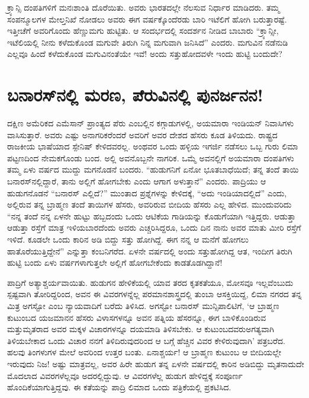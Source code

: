 \newpage

ಕ್ರ್ಯಾನ್ಸಿ ದಂಪತಿಗಳಿಗೆ ಮನಃಶಾಂತಿ ದೊರೆಯಿತು. ಅವರು ಭಾರತದಲ್ಲೇ ನೆಲಸುವ ನಿರ್ಧಾರ ಮಾಡಿದರು. ತಮ್ಮ ಸಂಪನ್ಮೂಲಗಳ ಮೇಲ್ತನಿಖೆ ನೋಡಲು ಅವರು ಈಗ ವರ್ಷಕ್ಕೊಂದೆರಡು ಬಾರಿ ಇಟೆಲಿಗೆ ಹೋಗಿ ಬರುತ್ತಾರಷ್ಟೆ. ಇತ್ತೀಚೆಗೆ ಅವರಿಗೊಂದು ಹೆಣ್ಣುಮಗು ಹುಟ್ಟಿತು. ಆ ಸಂದರ್ಭದಲ್ಲಿ ಸಂದರ್ಶನ ನೀಡಿದ ಬಾಬಾರು “ಕ್ರ್ಯಾನ್ಸೀ, ಇಟೆಲಿಯಲ್ಲಿ ನೀನು ಕಳೆದುಕೊಂಡ ಮಗುವೇ ತಿರುಗಿ ನಿನ್ನ ಮಗುವಾಗಿ ಜನಿಸಿದೆ” ಎಂದರು. ಮಗುವಿನ ನಡೆನುಡಿ ಎಲ್ಲವೂ ಹಿಂದೆ ಕಳೆದುಕೊಂಡ ಮಗುವಿನಂತೆಯೇ ಇವೆ! ಅಂದು ಸತ್ತುಹೋದವಳೇ ಇಂದು ಹುಟ್ಟಿ ಬಂದುದೇ?


\section*{ಬನಾರಸ್​ನಲ್ಲಿ ಮರಣ, ಪೆರುವಿನಲ್ಲಿ ಪುನರ್ಜನನ!}


ದಕ್ಷಿಣ ಅಮೆರಿಕದ ಎಮೆಸಾನ್ ಪ್ರಾಂತ್ಯದ ಪೆರು ಎಂಬಲ್ಲಿನ ಕಗ್ಗಾಡುಗಳಲ್ಲಿ, ಅಯಮಾರಾ ಇಂಡಿಯನ್ ನಿವಾಸಿಗಳು ವಾಸಿಸುತ್ತಾರೆ. ಅವರು ಎಷ್ಟು ಅನಾಗರಿಕರೆಂದರೆ ಅವರಿಗೆ ಅವರ ದೇಶದ ಹೆಸರು ಕೂಡ ತಿಳಿಯದು. ರಾಷ್ಟ್ರದ ರಾಜಕೀಯ ಭಾಷೆಯಾದ ಸ್ಪೇನಿಷ್ ಕೇಳಿದವರಲ್ಲ. ಅಂಥವರ ಒಂದು ಹಳ್ಳಿಯ ಇಗರ್ಜಿ ನಡೆಸಲು ಒಬ್ಬ ಗುರು ಲಿಮಾ ಪಟ್ಟಣದಿಂದ ನೇಮಕ\-ಗೊಂಡು ಬಂದ. ಅಲ್ಲಿ ಅವನೊಬ್ಬನೇ ನಾಗರಿಕ. ಒಮ್ಮೆ ಅವನಲ್ಲಿಗೆ ಅಯಮಾರಾ ದಂಪತಿಗಳು ತಮ್ಮ ಏಳು ವರ್ಷದ ಮುದ್ದು ಮಗನೊಡನೆ ಬಂದರು. “ಹುಡುಗನಿಗೆ ಏನೋ ಭೂತಬಾಧೆಯಿದೆ; ತನ್ನ ತಂದೆ ತಾಯಿ ಬನಾರಸ್​ನಲ್ಲಿದ್ದಾರೆ, ತಾನು ಅಲ್ಲಿಗೆ ಹೋಗಬೇಕು ಎಂದು ಆಗಾಗ ಅಳುತ್ತಾನೆ” ಎಂದರು. ಪಾದ್ರಿಯು ಆ ಹುಡುಗನೊಡನೆ “ಬನಾರಸ್ ಎಲ್ಲಿದೆ?” ಮುಂತಾದ ಪ್ರಶ್ನೆಗಳನ್ನು ಕೇಳಿದಕ್ಕೆ, “ಅದು ಇಂಡಿಯಾದಲ್ಲಿದೆ” ಎಂದು, ಅಲ್ಲಿರುವ ತನ್ನ ಬ್ರಾಹ್ಮಣ ತಂದೆ ತಾಯಿಗಳ ಹೆಸರು, ಅವರಿರುವ ಬೀದಿಯ ಹೆಸರು ಎಲ್ಲ ಹೇಳಿದ. ಮುಂದುವರಿದು “ನನ್ನ ತಂದೆ ನನ್ನ ಏಳನೇ ಹುಟ್ಟು ಹಬ್ಬದಂದು ಒಂದು ಆಟಿಕೆಯ ಗಾಡಿಯನ್ನು ಕೊಡುಗೆಯಾಗಿ ಇತ್ತಿದ್ದರು. ಆಡುತ್ತಾ ಆಡುತ್ತಾ ರಸ್ತೆಗೆ ಮಾತ್ರ ಇಳಿಯಬಾರದೆಂದು ಅವರು ಎಚ್ಚರಿಸಿದ್ದರೂ, ಒಂದು ದಿನ ನಾನು ಅವರ ಮಾತು ಮೀರಿ ರಸ್ತೆಗೆ ಇಳಿದೆ. ಕೂಡಲೇ ಒಂದು ಕಾರಿನ ಅಡಿ ಬಿದ್ದು ಸತ್ತು ಹೋಗಿದ್ದೆ. ಈಗ ನನ್ನ ಆ ಮನೆಗೆ ಹೋಗಲು ಹಾತೊರೆಯುತ್ತಿದ್ದೇನೆ” ಎನ್ನುತ್ತಾ ಕಂಬನಿಗರೆದ. ಏಳನೇ ವರ್ಷದಲ್ಲಿ ಅಂದು ಸತ್ತುಹೋಗಿದ್ದ ಆತ, ಇಂದೀಗ ತಿರುಗಿ ಹುಟ್ಟಿ ಬಂದು ಏಳು ವರ್ಷಗಳಾಗುತ್ತಲೇ ಅಲ್ಲಿಗೆ ಹೋಗಬೇಕೆಂದು ಕಾಡತೊಡಗಿದ್ದಾನೆ!

ಪಾದ್ರಿಗೆ ಅತ್ಯಾಶ್ಚರ್ಯವಾಯಿತು. ಹುಡುಗನ ಹೇಳಿಕೆಯಲ್ಲಿ ಯಾವ ತರದ ಕೃತಕತೆಯೂ, ಮೋಸವೂ ಇಲ್ಲವೆಂಬುದು ಸ್ಪಷ್ಟವಾಗಿ ತೋರಿದ್ದರಿಂದ, ಅವನ ಈ ವಿವರಗಳನ್ನೆಲ್ಲ ಪರಮಾನ\break ಶಾಸ್ತ್ರದಲ್ಲಿ ತುಂಬಾ ಆಸಕ್ತಿಯಿದ್ದ, ಲಿಮಾ ನಗರದ ತನ್ನ ಮಿತ್ರ ಅಗಸ್ಟೋ ಎಂಬ ನ್ಯಾಯವಾದಿಗೆ ಬರೆದು ತಿಳಿಸಿದ. ಅಗಸ್ಟೋ ಬನಾರಸ್ ಮುನ್ಸಿಪಾಲಿಟಿಗೆ, ‘ಆ ಬ್ರಾಹ್ಮಣ ಕುಟುಂಬದ ಯಜಮಾನನ ಹೆಸರು ವಿಳಾಸಗಳನ್ನೂ ಅವನ ಪತ್ನಿಯ ಹೆಸರನ್ನೂ, ಈಗ ಬಾಳಿಕೊಂಡಿರುವ ಮತ್ತು\break ಮೃತ\-ರಾದ ಅವರ ಮಕ್ಕಳ ವಿಚಾರಗಳನ್ನೂ ದಯಮಾಡಿ ತಿಳಿಸಬೇಕು. ಆ ಕುಟುಂಬದವರು\break ಅಗತ್ಯವಾಗಿ ತಿಳಿಯಬೇಕಾದ ಒಂದು ವಿಚಾರ ನನಗೆ ತಿಳಿದಿರುವುದರಿಂದ ಆ ಬಗ್ಗೆ ಹೆಚ್ಚಿನ ವಿವರ ಕೇಳಿರುವುದಾಗಿ’ ಪತ್ರಬರೆದ. ಹಲವು ತಿಂಗಳುಗಳ ಮೇಲೆ ಅವರಿಂದ ಉತ್ತರ ಬಂತು. ಏನಾಶ್ಚರ್ಯ! ಆ ಬ್ರಾಹ್ಮಣ ಕುಟುಂಬ ಆ ಬೀದಿಯಲ್ಲೇ ಇರುವುದು ನಿಜ! ಅಷ್ಟು ಮಾತ್ರವಲ್ಲ, ಅವರ ಹಿರೇ ಹುಡುಗ ತನ್ನ ಏಳನೇ ವರ್ಷದಲ್ಲಿ ಕಾರಿನ ಅಡಿಬಿದ್ದು ಮೃತನಾದುದೇ ಮೊದಲಾದ ವಿವರಗಳೆಲ್ಲವೂ ಅದರಲ್ಲಿದ್ದುವು. ಆ ವಿವರಗಳೆಲ್ಲ ಹುಡುಗ ಹೇಳಿದ್ದಕ್ಕೆ ಸಂಪೂರ್ಣ ಹೊಂದಿಕೆಯಾಗುತ್ತಿದ್ದವು. ಈ ಕತೆಯನ್ನು ಪಾದ್ರಿ ಲಿಮಾದ ಒಂದು ಪತ್ರಿಕೆಯಲ್ಲಿ ಪ್ರಕಟಿಸಿದ.

